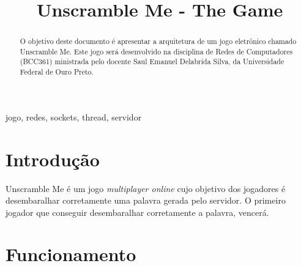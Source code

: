 \documentclass[conference]{IEEEtran}
\begin{document}
\title{Unscramble Me - The Game
}

\author{
\and
{}
\and
{}
}

\maketitle

\begin{abstract}
O objetivo deste documento é apresentar a arquitetura de um jogo eletrônico chamado Unscramble Me. Este jogo será desenvolvido na disciplina de Redes de Computadores (BCC361) ministrada pelo docente Saul Emanuel Delabrida Silva, da Universidade Federal de Ouro Preto.
\end{abstract}

\begin{IEEEkeywords}
jogo, redes, sockets, thread, servidor
\end{IEEEkeywords}

\section{Introdução}
Unscramble Me é um jogo \textit{multiplayer online} cujo objetivo dos jogadores é desembaralhar corretamente uma palavra gerada pelo servidor. O primeiro jogador que conseguir desembaralhar corretamente a palavra, vencerá.

\section{Funcionamento}
\end{document}
